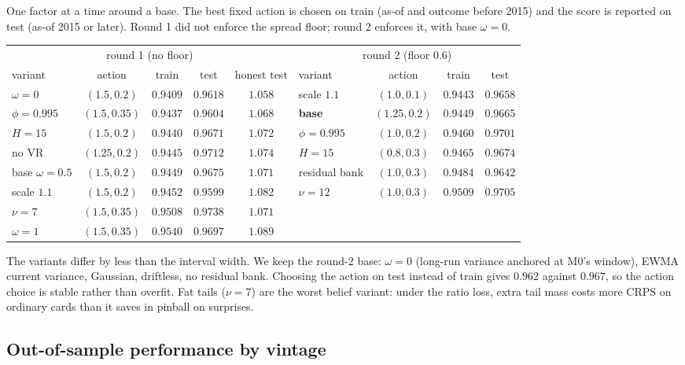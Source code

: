 One factor at a time around a base. The best fixed action is chosen on train (as-of and outcome before 2015) and the score is reported on test
(as-of 2015 or later). Round 1 did not enforce the spread floor; round 2 enforces it, with base $\omega=0$.
\begin{center}
{\footnotesize\setlength{\tabcolsep}{2.5pt}\begin{tabular}{lcccc|lccc}
\toprule
\multicolumn{5}{c|}{round 1 (no floor)} & \multicolumn{4}{c}{round 2 (floor $0.6$)}\\
variant & action & train & test & honest test & variant & action & train & test\\
\midrule
$\omega=0$ & $(1.5,0.2)$ & $\mathbf{0.9409}$ & $0.9618$ & $1.058$ & scale $1.1$ & $(1.0,0.1)$ & $\mathbf{0.9443}$ & $0.9658$\\
$\phi=0.995$ & $(1.5,0.35)$ & $0.9437$ & $0.9604$ & $1.068$ & \textbf{base} & $(1.25,0.2)$ & $0.9449$ & $0.9665$\\
$H=15$ & $(1.5,0.2)$ & $0.9440$ & $0.9671$ & $1.072$ & $\phi=0.995$ & $(1.0,0.2)$ & $0.9460$ & $0.9701$\\
no VR & $(1.25,0.2)$ & $0.9445$ & $0.9712$ & $1.074$ & $H=15$ & $(0.8,0.3)$ & $0.9465$ & $0.9674$\\
base $\omega=0.5$ & $(1.5,0.2)$ & $0.9449$ & $0.9675$ & $1.071$ & residual bank & $(1.0,0.3)$ & $0.9484$ & $0.9642$\\
scale $1.1$ & $(1.5,0.2)$ & $0.9452$ & $0.9599$ & $1.082$ & $\nu=12$ & $(1.0,0.3)$ & $0.9509$ & $0.9705$\\
$\nu=7$ & $(1.5,0.35)$ & $0.9508$ & $0.9738$ & $1.071$ &&&&\\
$\omega=1$ & $(1.5,0.35)$ & $0.9540$ & $0.9697$ & $1.089$ &&&&\\
\bottomrule
\end{tabular}}
\end{center}
The variants differ by less than the interval width. We keep the round-2 base: $\omega=0$ (long-run variance anchored at M0's window), EWMA
current variance, Gaussian, driftless, no residual bank. Choosing the action on test instead of train gives $0.962$ against $0.967$, so the action
choice is stable rather than overfit. Fat tails ($\nu=7$) are the worst belief variant: under the ratio loss, extra tail mass costs more CRPS on
ordinary cards than it saves in pinball on surprises.

\subsection{Out-of-sample performance by vintage}

